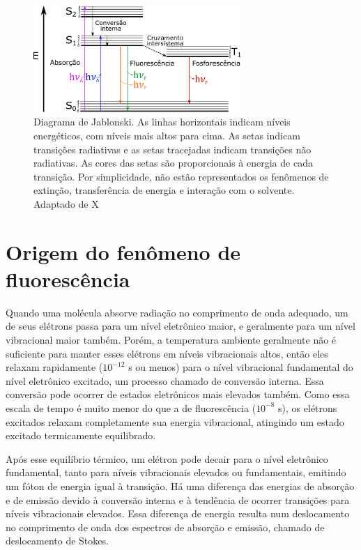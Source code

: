 		\begin{figure}[h]
			\centering
			\includegraphics[width=0.7\textwidth]{imagens/fluor/diagrama_jablonski}
			\caption[Diagrama de Jablonski]{Diagrama de Jablonski. As linhas horizontais indicam níveis energéticos, com níveis mais altos para cima. As setas indicam transições radiativas e as setas tracejadas indicam transições não radiativas. As cores das setas são proporcionais à energia de cada transição. Por simplicidade, não estão representados os fenômenos de extinção, transferência de energia e interação com o solvente. Adaptado de X}
			\label{fig:diagrama_jablonski}  %
		\end{figure}  
		
		\section{Origem do fenômeno de fluorescência} 
		
		Quando uma molécula absorve radiação no comprimento de onda adequado, um de seus elétrons passa para um nível eletrônico maior, e geralmente para um nível vibracional maior também. Porém, a temperatura ambiente geralmente não é suficiente para manter esses elétrons em níveis vibracionais altos, então eles relaxam rapidamente (\(10^{-12}\) s ou menos) para o nível vibracional fundamental do nível eletrônico excitado, um processo chamado de conversão interna. Essa conversão pode ocorrer de estados eletrônicos mais elevados também. Como essa escala de tempo é muito menor do que a de fluorescência (\(10^{-8}\) s), os elétrons excitados relaxam completamente sua energia vibracional, atingindo um estado excitado termicamente equilibrado.
		
		Após esse equilíbrio térmico, um elétron pode decair para o nível eletrônico fundamental, tanto para níveis vibracionais elevados ou fundamentais, emitindo um fóton de energia igual à transição. Há uma diferença das energias de absorção e de emissão devido à conversão interna e à tendência de ocorrer transições para níveis vibracionais elevados. Essa diferença de energia resulta num deslocamento no comprimento de onda dos espectros de absorção e emissão, chamado de deslocamento de Stokes. 
		
